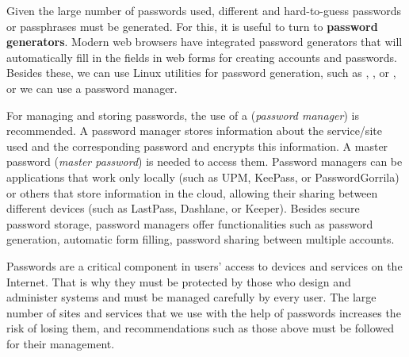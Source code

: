 Given the large number of passwords used, different and hard-to-guess passwords or passphrases must be generated.
For this, it is useful to turn to \textbf{password generators}.
Modern web browsers have integrated password generators that will automatically fill in the fields in web forms for creating accounts and passwords.
Besides these, we can use Linux utilities for password generation, such as , , or , or we can use a password manager.

For managing and storing passwords, the use of a  (\textit{password manager}) is recommended.
A password manager stores information about the service/site used and the corresponding password and encrypts this information.
A master password (\textit{master password}) is needed to access them.
Password managers can be applications that work only locally (such as UPM, KeePass, or PasswordGorrila) or others that store information in the cloud, allowing their sharing between different devices (such as LastPass, Dashlane, or Keeper).
Besides secure password storage, password managers offer functionalities such as password generation, automatic form filling, password sharing between multiple accounts.

Passwords are a critical component in users' access to devices and services on the Internet.
That is why they must be protected by those who design and administer systems and must be managed carefully by every user.
The large number of sites and services that we use with the help of passwords increases the risk of losing them, and recommendations such as those above must be followed for their management.
